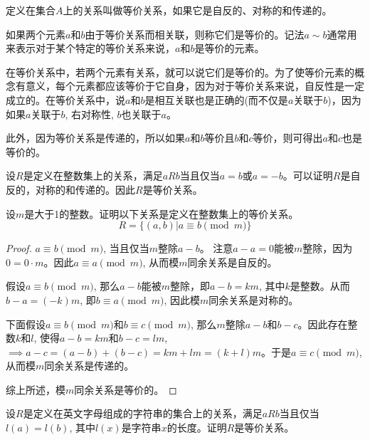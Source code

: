 \begin{definition}[等价关系]
	定义在集合$A$上的关系叫做等价关系，如果它是自反的、对称的和传递的。
\end{definition}

\begin{definition}[等价元素]
	如果两个元素$a$和$b$由于等价关系而相关联，则称它们是等价的。记法$a\sim b$通常用来表示对于某个特定的等价关系来说，$a$和$b$是等价的元素。
\end{definition}

\begin{note}
	在等价关系中，若两个元素有关系，就可以说它们是等价的。为了使等价元素的概念有意义，每个元素都应该等价于它自身，因为对于等价关系来说，自反性是一定成立的。在等价关系中，说$a$和$b$是相互关联也是正确的(而不仅是$a$关联于$b$)，因为如果$a$关联于$b$, 右对称性, $b$也关联于$a$。
	
	此外，因为等价关系是传递的，所以如果$a$和$b$等价且$b$和$c$等价，则可得出$a$和$c$也是等价的。
\end{note}

\begin{example}
	设$R$是定义在整数集上的关系，满足$aRb$当且仅当$a=b$或$a=-b$。可以证明$R$是自反的，对称的和传递的。因此$R$是等价关系。
\end{example}

\begin{example}[模$m$同余]
	设$m$是大于1的整数。证明以下关系是定义在整数集上的等价关系。
	\[R=\{(a,b)|a\equiv b\pmod{m}\} \]
\end{example}

\begin{proof}
	$a\equiv b\pmod{m}$, 当且仅当$m$整除$a-b$。 注意$a-a=0$能被$m$整除，因为$0=0\cdot m$。因此$a\equiv a\pmod{m}$, 从而模$m$同余关系是自反的。
	
	假设$a\equiv b\pmod{m}$, 那么$a-b$能被$m$整除，即$a-b=km$, 其中$k$是整数。从而$b-a=(-k)m$, 即$b\equiv a\pmod{m}$, 因此模$m$同余关系是对称的。
	
	下面假设$a\equiv b\pmod{m}$和$b\equiv c\pmod{m}$, 那么$m$整除$a-b$和$b-c$。因此存在整数$k$和$l$, 使得$a-b=km$和$b-c=lm$, $\implies a-c=(a-b)+(b-c)=km+lm=(k+l)m$。于是$a\equiv c\pmod{m}$, 从而模$m$同余关系是传递的。
	
	综上所述，模$m$同余关系是等价的。
\end{proof}

\begin{example}
	设$R$是定义在英文字母组成的字符串的集合上的关系，满足$aRb$当且仅当$l(a)=l(b)$, 其中$l(x)$是字符串$x$的长度。证明$R$是等价关系。
\end{example}


